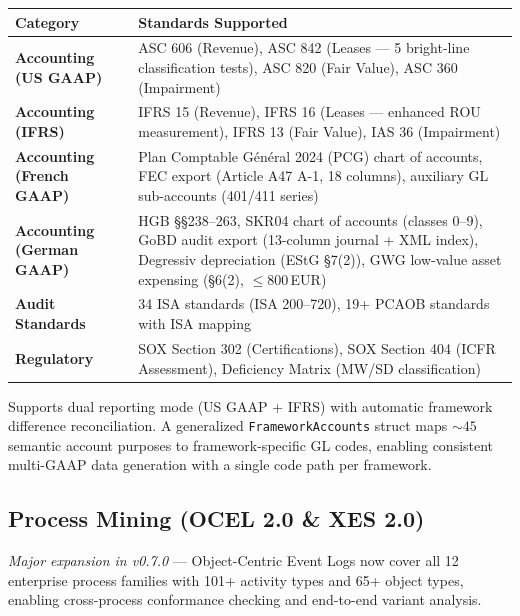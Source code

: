 \documentclass[11pt,a4paper]{article}
\begin{document}
\vspace{0.4em}
\noindent
\renewcommand{\arraystretch}{1.2}
\begin{tabularx}{\textwidth}{>{\bfseries\color{brand}}l X}
\toprule
\textbf{Category} & \textbf{Standards Supported} \\
\midrule
Accounting (US GAAP) &
  ASC 606 (Revenue), ASC 842 (Leases --- 5 bright-line classification tests),
  ASC 820 (Fair Value), ASC 360 (Impairment) \\
Accounting (IFRS) &
  IFRS 15 (Revenue), IFRS 16 (Leases --- enhanced ROU measurement),
  IFRS 13 (Fair Value), IAS 36 (Impairment) \\
Accounting (French GAAP) &
  Plan Comptable G\'{e}n\'{e}ral 2024 (PCG) chart of accounts,
  FEC export (Article A47 A-1, 18 columns),
  auxiliary GL sub-accounts (401/411 series) \\
Accounting (German GAAP) &
  HGB \S\S{}238--263, SKR04 chart of accounts (classes 0--9),
  GoBD audit export (13-column journal + XML index),
  Degressiv depreciation (EStG \S{}7(2)),
  GWG low-value asset expensing (\S{}6(2), $\leq$800\,EUR) \\
Audit Standards &
  34 ISA standards (ISA 200--720), 19+ PCAOB standards with ISA mapping \\
Regulatory &
  SOX Section 302 (Certifications), SOX Section 404 (ICFR Assessment),
  Deficiency Matrix (MW/SD classification) \\
\bottomrule
\end{tabularx}
\renewcommand{\arraystretch}{1.0}

\vspace{0.3em}
\noindent
Supports dual reporting mode (US GAAP + IFRS) with automatic framework
difference reconciliation. A generalized \texttt{FrameworkAccounts} struct maps
${\sim}45$ semantic account purposes to framework-specific GL codes, enabling
consistent multi-GAAP data generation with a single code path per framework.

\subsection{Process Mining (OCEL 2.0 \& XES 2.0)}

\textit{Major expansion in v0.7.0} --- Object-Centric Event Logs now cover
all 12 enterprise process families with 101+ activity types and 65+ object types,
enabling cross-process conformance checking and end-to-end variant analysis.
\end{document}
